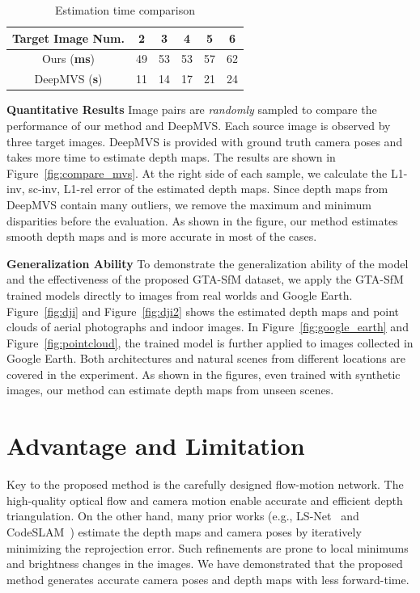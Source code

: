 \documentclass[letterpaper, 10 pt, conference]{ieeeconf}  %
\begin{document}
\begin{table}[h]
\centering
\caption{Estimation time comparison}
\label{multiview_runtime}
\begin{tabular}{c|ccccc}
Target Image Num. & 2  & 3  & 4  & 5 
& 6  \\ \hline
Ours (\textbf{ms})   & 49 & 53 & 53 & 57 & 62 \\
DeepMVS (\textbf{s}) & 11 & 14 & 17 & 21 & 24 \\ \hline
\end{tabular}
\end{table}
 
\textbf{Quantitative Results} Image pairs are \textit{randomly} sampled to compare the performance of our method and DeepMVS. Each source image is observed by three target images. DeepMVS is provided with ground truth camera poses and takes more time to estimate depth maps. The results are shown in Figure~\ref{fig:compare_mvs}. At the right side of each sample, we calculate the L1-inv, sc-inv, L1-rel error of the estimated depth maps. Since depth maps from DeepMVS contain many outliers, we remove the maximum and minimum disparities before the evaluation. As shown in the figure, our method estimates smooth depth maps and is more accurate in most of the cases.
 
\textbf{Generalization Ability} To demonstrate the generalization ability of the model and the effectiveness of the proposed GTA-SfM dataset, we apply the GTA-SfM trained models directly to images from real worlds and Google Earth. Figure~\ref{fig:dji} and Figure~\ref{fig:dji2} shows the estimated depth maps and point clouds of aerial photographs and indoor images. In Figure~\ref{fig:google_earth} and Figure~\ref{fig:pointcloud}, the trained model is further applied to images collected in Google Earth. Both architectures and natural scenes from different locations are covered in the experiment. As shown in the figures, even trained with synthetic images, our method can estimate depth maps from unseen scenes.
  
\section{Advantage and Limitation}
Key to the proposed method is the carefully designed flow-motion network. The high-quality optical flow and camera motion enable accurate and efficient depth triangulation. On the other hand, many prior works (e.g., LS-Net~\cite{ls_net} and CodeSLAM~\cite{code_slam}) estimate the depth maps and camera poses by iteratively minimizing the reprojection error. Such refinements are prone to local minimums and brightness changes in the images. We have demonstrated that the proposed method generates accurate camera poses and depth maps with less forward-time.
 
\end{document}
